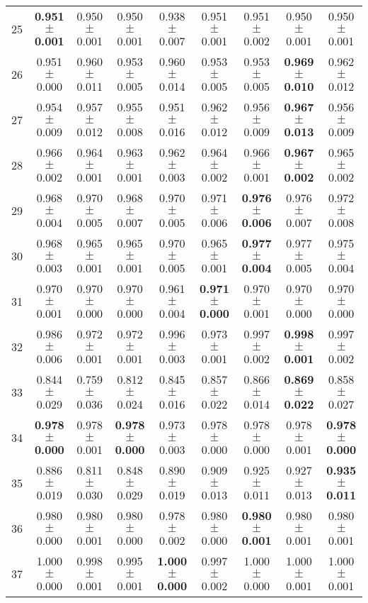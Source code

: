 \begin{table}[!ht]
{\begin{tabular}{r c c c c c c c c}
25 & \textbf{0.951 $\pm$ 0.001} & 0.950 $\pm$ 0.001 & 0.950 $\pm$ 0.001 & 0.938 $\pm$ 0.007 & 0.951 $\pm$ 0.001 & 0.951 $\pm$ 0.002 & 0.950 $\pm$ 0.001 & 0.950 $\pm$ 0.001 \\
26 & 0.951 $\pm$ 0.000 & 0.960 $\pm$ 0.011 & 0.953 $\pm$ 0.005 & 0.960 $\pm$ 0.014 & 0.953 $\pm$ 0.005 & 0.953 $\pm$ 0.005 & \textbf{0.969 $\pm$ 0.010} & 0.962 $\pm$ 0.012 \\
27 & 0.954 $\pm$ 0.009 & 0.957 $\pm$ 0.012 & 0.955 $\pm$ 0.008 & 0.951 $\pm$ 0.016 & 0.962 $\pm$ 0.012 & 0.956 $\pm$ 0.009 & \textbf{0.967 $\pm$ 0.013} & 0.956 $\pm$ 0.009 \\
28 & 0.966 $\pm$ 0.002 & 0.964 $\pm$ 0.001 & 0.963 $\pm$ 0.001 & 0.962 $\pm$ 0.003 & 0.964 $\pm$ 0.002 & 0.966 $\pm$ 0.001 & \textbf{0.967 $\pm$ 0.002} & 0.965 $\pm$ 0.002 \\
29 & 0.968 $\pm$ 0.004 & 0.970 $\pm$ 0.005 & 0.968 $\pm$ 0.007 & 0.970 $\pm$ 0.005 & 0.971 $\pm$ 0.006 & \textbf{0.976 $\pm$ 0.006} & 0.976 $\pm$ 0.007 & 0.972 $\pm$ 0.008 \\
30 & 0.968 $\pm$ 0.003 & 0.965 $\pm$ 0.001 & 0.965 $\pm$ 0.001 & 0.970 $\pm$ 0.005 & 0.965 $\pm$ 0.001 & \textbf{0.977 $\pm$ 0.004} & 0.977 $\pm$ 0.005 & 0.975 $\pm$ 0.004 \\
31 & 0.970 $\pm$ 0.001 & 0.970 $\pm$ 0.000 & 0.970 $\pm$ 0.000 & 0.961 $\pm$ 0.004 & \textbf{0.971 $\pm$ 0.000} & 0.970 $\pm$ 0.001 & 0.970 $\pm$ 0.000 & 0.970 $\pm$ 0.000 \\
32 & 0.986 $\pm$ 0.006 & 0.972 $\pm$ 0.001 & 0.972 $\pm$ 0.001 & 0.996 $\pm$ 0.003 & 0.973 $\pm$ 0.001 & 0.997 $\pm$ 0.002 & \textbf{0.998 $\pm$ 0.001} & 0.997 $\pm$ 0.002 \\
33 & 0.844 $\pm$ 0.029 & 0.759 $\pm$ 0.036 & 0.812 $\pm$ 0.024 & 0.845 $\pm$ 0.016 & 0.857 $\pm$ 0.022 & 0.866 $\pm$ 0.014 & \textbf{0.869 $\pm$ 0.022} & 0.858 $\pm$ 0.027 \\
34 & \textbf{0.978 $\pm$ 0.000} & 0.978 $\pm$ 0.001 & \textbf{0.978 $\pm$ 0.000} & 0.973 $\pm$ 0.003 & 0.978 $\pm$ 0.000 & 0.978 $\pm$ 0.000 & 0.978 $\pm$ 0.001 & \textbf{0.978 $\pm$ 0.000} \\
35 & 0.886 $\pm$ 0.019 & 0.811 $\pm$ 0.030 & 0.848 $\pm$ 0.029 & 0.890 $\pm$ 0.019 & 0.909 $\pm$ 0.013 & 0.925 $\pm$ 0.011 & 0.927 $\pm$ 0.013 & \textbf{0.935 $\pm$ 0.011} \\
36 & 0.980 $\pm$ 0.000 & 0.980 $\pm$ 0.001 & 0.980 $\pm$ 0.000 & 0.978 $\pm$ 0.002 & 0.980 $\pm$ 0.000 & \textbf{0.980 $\pm$ 0.001} & 0.980 $\pm$ 0.001 & 0.980 $\pm$ 0.001 \\
37 & 1.000 $\pm$ 0.000 & 0.998 $\pm$ 0.001 & 0.995 $\pm$ 0.001 & \textbf{1.000 $\pm$ 0.000} & 0.997 $\pm$ 0.002 & 1.000 $\pm$ 0.000 & 1.000 $\pm$ 0.001 & 1.000 $\pm$ 0.001 \\

\end{tabular}}
\end{table}
